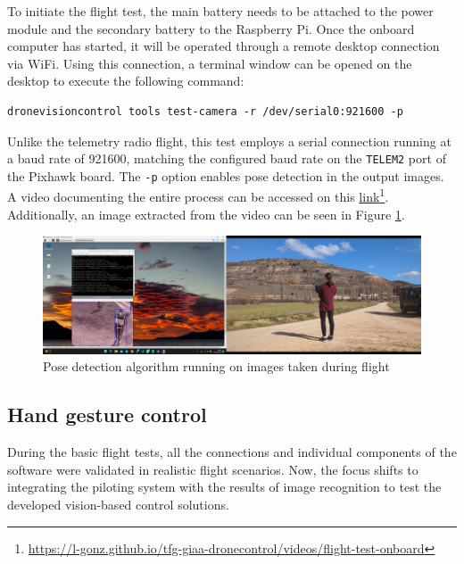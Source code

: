 To initiate the flight test, the main battery needs to be attached to the power module and the secondary battery to the Raspberry Pi. Once the onboard computer has started, it will be operated through a remote desktop connection via WiFi. Using this connection, a terminal window can be opened on the desktop to execute the following command:
\begin{verbatim}
dronevisioncontrol tools test-camera -r /dev/serial0:921600 -p
\end{verbatim}


Unlike the telemetry radio flight, this test employs a serial connection running at a baud rate of 921600, matching the configured baud rate on the \texttt{TELEM2} port of the Pixhawk board. The \texttt{-p} option enables pose detection in the output images. A video documenting the entire process can be accessed on this \href{https://l-gonz.github.io/tfg-giaa-dronecontrol/videos/flight-test-onboard}{link}\footnote{\url{https://l-gonz.github.io/tfg-giaa-dronecontrol/videos/flight-test-onboard}}. Additionally, an image extracted from the video can be seen in Figure \ref{fig:flight-test-cam-onboard}.


\begin{figure}
  \centering
  \includegraphics[width=\textwidth, keepaspectratio]{img/video-field-test-onboard.png}
  \caption{Pose detection algorithm running on images taken during flight}
  \label{fig:flight-test-cam-onboard}
\end{figure}


\subsection{Hand gesture control}
\label{subsec:fl-test-4}


During the basic flight tests, all the connections and individual components of the software were validated in realistic flight scenarios. Now, the focus shifts to integrating the piloting system with the results of image recognition to test the developed vision-based control solutions.

